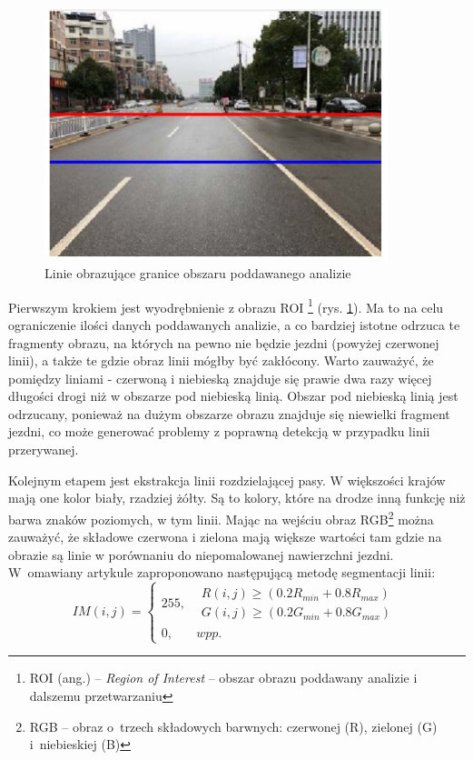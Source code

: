 \begin{figure}
  \centering
  \includegraphics[width=10cm]{img/roi.png}
  \caption{Linie obrazujące granice obszaru poddawanego analizie\cite{T3}}
  \label{fig:roi}
\end{figure}

Pierwszym krokiem jest wyodrębnienie z obrazu ROI \footnote{ROI (ang.) -- \textit{Region of Interest} -- obszar obrazu poddawany analizie i dalszemu przetwarzaniu} (rys. \ref{fig:roi}). %
Ma to na celu ograniczenie ilości danych poddawanych analizie, a co bardziej istotne odrzuca te fragmenty obrazu, na których na pewno nie będzie jezdni (powyżej czerwonej linii), a także te gdzie obraz linii mógłby być zakłócony. 
Warto zauważyć, że pomiędzy liniami - czerwoną i niebieską znajduje się prawie dwa razy więcej długości drogi niż w obszarze pod niebieską linią. Obszar pod niebieską linią jest odrzucany, ponieważ na dużym obszarze obrazu znajduje się niewielki fragment jezdni, co może generować problemy z poprawną detekcją w przypadku linii przerywanej.

Kolejnym etapem jest ekstrakcja linii rozdzielającej pasy. %
W większości krajów mają one kolor biały, rzadziej żółty. 
Są to kolory, które na drodze inną funkcję niż barwa znaków poziomych, w tym linii. %
Mając na wejściu obraz RGB\footnote{RGB -- obraz o~trzech składowych barwnych: czerwonej (R), zielonej (G) i~niebieskiej (B)} można zauważyć, że składowe czerwona i zielona mają większe wartości tam gdzie na obrazie są linie w porównaniu do niepomalowanej nawierzchni jezdni. %
W~omawiany artykule zaproponowano następującą metodę segmentacji linii:
\begin{equation}
\label{eq:IMij}
IM(i,j)=\left\{\begin{matrix}
255, & \begin{matrix}
R(i,j)\geq (0.2R_{min}+0.8R_{max})\\ 
G(i,j)\geq (0.2G_{min}+0.8G_{max})
\end{matrix}\\ 
0, & wpp.
\end{matrix}\right.
\end{equation}

